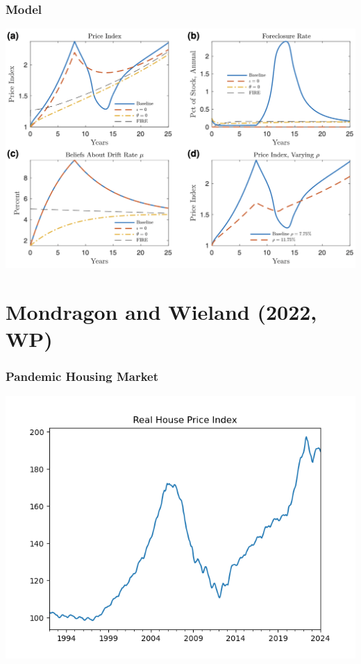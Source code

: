 \documentclass[english,xcolor=svgnames]{beamer}
\begin{document}
\begin{frame}
	\frametitle[alignment=center]{Model}
	\centering
	\includegraphics[scale=0.4]{figures/CGMFIG9.png}
\end{frame}

\section{Mondragon and Wieland (2022, WP)}

\begin{frame}
	\frametitle[alignment=center]{Pandemic Housing Market}
	\centering
	\includegraphics[scale=0.5]{figures/real_house_price.png}
\end{frame}
\end{document}
